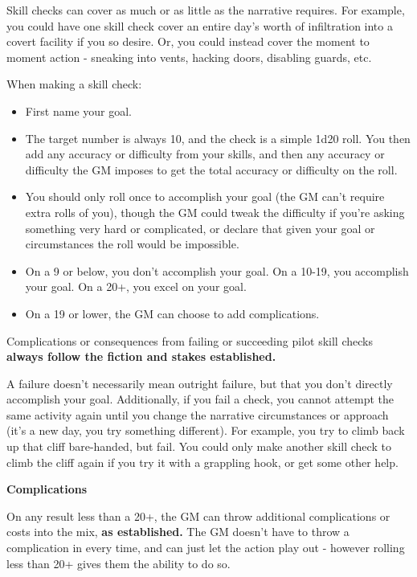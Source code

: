 Skill checks can cover as much or as little as the narrative requires. For example, you could have one skill check cover an entire day's worth of infiltration into a covert facility if you so desire. Or, you could instead cover the moment to moment action - sneaking into vents, hacking doors, disabling guards, etc.

When making a skill check:
\begin{itemize}
\item First name your goal. 
\item The target number is always 10, and the check is a simple 1d20 roll. You then add any accuracy or difficulty from your skills, and then any accuracy or difficulty the GM imposes to get the total accuracy or difficulty on the roll. 
\item You should only roll once to accomplish your goal (the GM can't require extra rolls of you), though the GM could tweak the difficulty if you're asking something very hard or complicated, or declare that given your goal or circumstances the roll would be impossible. 
\item On a 9 or below, you don't accomplish your goal. On a 10-19, you accomplish your goal. On a 20+, you excel on your goal. 
\item On a 19 or lower, the GM can choose to add complications.
\end{itemize}  

Complications or consequences from failing or succeeding pilot skill checks \textbf{always follow the fiction and stakes established.} 


A failure doesn't necessarily mean outright failure, but that you don't directly accomplish your goal. Additionally, if you fail a check, you cannot attempt the same activity again until you change the narrative circumstances or approach (it's a new day, you try something different). For example, you try to climb back up that cliff bare-handed, but fail. You could only make another skill check to climb the cliff again if you try it with a grappling hook, or get some other help.

\begin{center}
\textbf{Complications}
\end{center}

On any result less than a 20+, the GM can throw additional complications or costs into the mix, \textbf{as established.} The GM doesn't have to throw a complication in every time, and can just let the action play out - however rolling less than 20+ gives them the ability to do so. 


